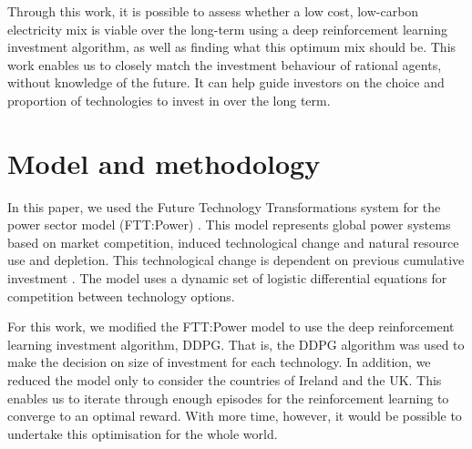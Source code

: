 \documentclass{article}
\begin{document}
Through this work, it is possible to assess whether a low cost, low-carbon electricity mix is viable over the long-term using a deep reinforcement learning investment algorithm, as well as finding what this optimum mix should be. This work enables us to closely match the investment behaviour of rational agents, without knowledge of the future. It can help guide investors on the choice and proportion of technologies to invest in over the long term.




\section{Model and methodology}
\label{sec:methods}


In this paper, we used the Future Technology Transformations system for the power sector model (FTT:Power) \cite{Mercure2012}. This model represents global power systems based on market competition, induced technological change and natural resource use and depletion. This technological change is dependent on previous cumulative investment \cite{Mercure2012}. The model uses a dynamic set of logistic differential equations for competition between technology options.

For this work, we modified the FTT:Power model to use the deep reinforcement learning investment algorithm, DDPG. That is, the DDPG algorithm was used to make the decision on size of investment for each technology. In addition, we reduced the model only to consider the countries of Ireland and the UK. This enables us to iterate through enough episodes for the reinforcement learning to converge to an optimal reward. With more time, however, it would be possible to undertake this optimisation for the whole world.
\end{document}
